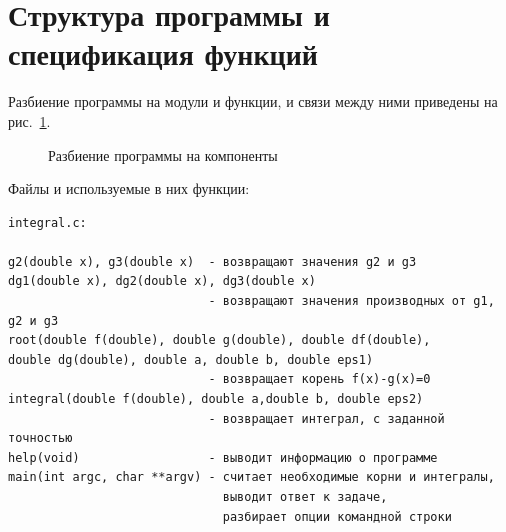 \documentclass[a4paper,12pt,titlepage,finall]{article}
\begin{document}
\newpage

\section{Структура программы и спецификация функций}

Разбиение программы на модули и функции, и связи между ними приведены на рис.~\ref{plot3}.
\begin{figure}[h]
\centering
{}

\caption{Разбиение программы на компоненты}
\label{plot3}
\end{figure}

Файлы и используемые в них функции:

\begin{verbatim}
integral.c:

g2(double x), g3(double x)  - возвращают значения g2 и g3
dg1(double x), dg2(double x), dg3(double x)
                            - возвращают значения производных от g1, g2 и g3
root(double f(double), double g(double), double df(double), 
double dg(double), double a, double b, double eps1)        
                            - возвращает корень f(x)-g(x)=0
integral(double f(double), double a,double b, double eps2)       
                            - возвращает интеграл, с заданной точностью
help(void)                  - выводит информацию о программе
main(int argc, char **argv) - считает необходимые корни и интегралы, 
                              выводит ответ к задаче, 
                              разбирает опции командной строки
\end{verbatim}
\end{document}
